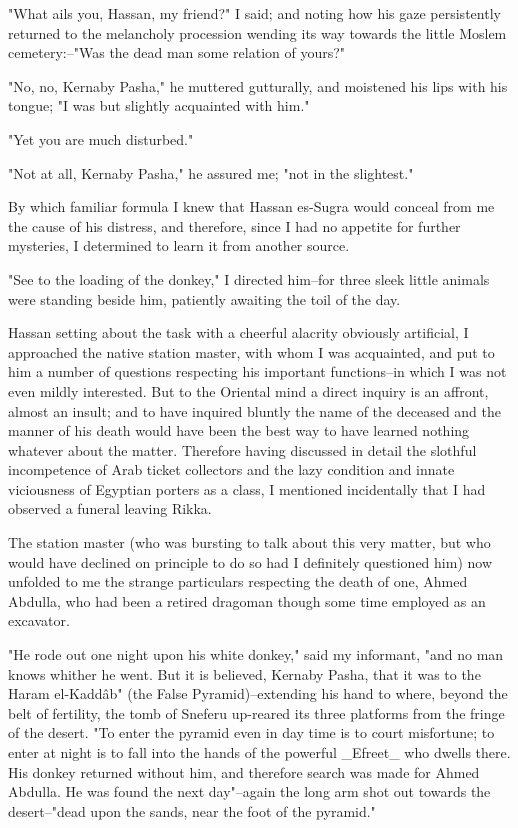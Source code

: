 "What ails you, Hassan, my friend?" I said; and noting how his gaze
persistently returned to the melancholy procession wending its way
towards the little Moslem cemetery:--"Was the dead man some relation
of yours?"

"No, no, Kernaby Pasha," he muttered gutturally, and moistened his
lips with his tongue; "I was but slightly acquainted with him."

"Yet you are much disturbed."

"Not at all, Kernaby Pasha," he assured me; "not in the slightest."

By which familiar formula I knew that Hassan es-Sugra would conceal
from me the cause of his distress, and therefore, since I had no
appetite for further mysteries, I determined to learn it from another
source.

"See to the loading of the donkey," I directed him--for three sleek
little animals were standing beside him, patiently awaiting the toil
of the day.

Hassan setting about the task with a cheerful alacrity obviously
artificial, I approached the native station master, with whom I was
acquainted, and put to him a number of questions respecting his
important functions--in which I was not even mildly interested. But to
the Oriental mind a direct inquiry is an affront, almost an insult;
and to have inquired bluntly the name of the deceased and the manner
of his death would have been the best way to have learned nothing
whatever about the matter. Therefore having discussed in detail the
slothful incompetence of Arab ticket collectors and the lazy condition
and innate viciousness of Egyptian porters as a class, I mentioned
incidentally that I had observed a funeral leaving Rikka.

The station master (who was bursting to talk about this very matter,
but who would have declined on principle to do so had I definitely
questioned him) now unfolded to me the strange particulars respecting
the death of one, Ahmed Abdulla, who had been a retired dragoman
though some time employed as an excavator.

"He rode out one night upon his white donkey," said my informant, "and
no man knows whither he went. But it is believed, Kernaby Pasha, that
it was to the Haram el-Kaddâb" (the False Pyramid)--extending his hand
to where, beyond the belt of fertility, the tomb of Sneferu up-reared
its three platforms from the fringe of the desert. "To enter the
pyramid even in day time is to court misfortune; to enter at night is
to fall into the hands of the powerful _Efreet_ who dwells there. His
donkey returned without him, and therefore search was made for Ahmed
Abdulla. He was found the next day"--again the long arm shot out
towards the desert--"dead upon the sands, near the foot of the
pyramid."

